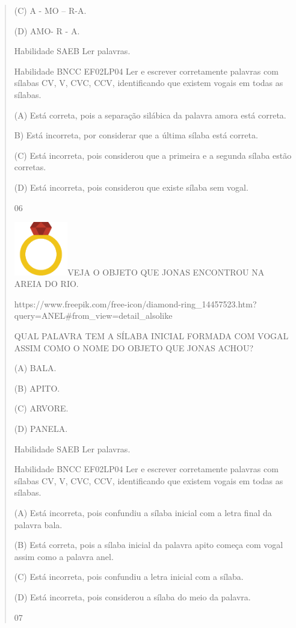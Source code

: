 {{{{\begin{verse}
{{\begin{escolha}
{{{{{(C) A - MO -- R-A.

(D) AMO- R - A.

\protect\hypertarget{_Hlk129375756}{}{}Habilidade SAEB Ler palavras.

Habilidade BNCC EF02LP04 Ler e escrever corretamente palavras com
sílabas CV, V, CVC, CCV, identificando que existem vogais em todas as
sílabas.

(A) Está correta, pois a separação silábica da palavra amora está
correta.

B) Está incorreta, por considerar que a última sílaba está correta.

(C) Está incorreta, pois considerou que a primeira e a segunda sílaba
estão corretas.

(D) Está incorreta, pois considerou que existe sílaba sem vogal.

\num{06}

\includegraphics[width=0.92222in,height=0.92222in]{media/image151.png}VEJA
O OBJETO QUE JONAS ENCONTROU NA AREIA DO RIO.

https://www.freepik.com/free-icon/diamond-ring\_14457523.htm?query=ANEL\#from\_view=detail\_alsolike

QUAL PALAVRA TEM A SÍLABA INICIAL FORMADA COM VOGAL ASSIM COMO O NOME DO
OBJETO QUE JONAS ACHOU?

(A) BALA.

(B) APITO.

(C) ARVORE.

(D) PANELA.

Habilidade SAEB Ler palavras.

Habilidade BNCC EF02LP04 Ler e escrever corretamente palavras com
sílabas CV, V, CVC, CCV, identificando que existem vogais em todas as
sílabas.

(A) Está incorreta, pois confundiu a sílaba inicial com a letra final da
palavra bala.

(B) Está correta, pois a sílaba inicial da palavra apito começa com
vogal assim como a palavra anel.

(C) Está incorreta, pois confundiu a letra inicial com a sílaba.

(D) Está incorreta, pois considerou a sílaba do meio da palavra.

\num{07}

}}}}}
\end{escolha}}}
\end{verse}}}}}
